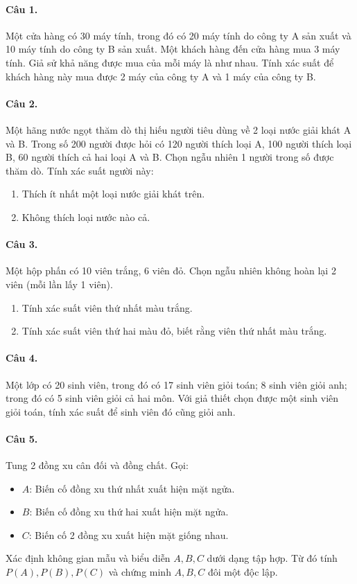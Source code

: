 \documentclass[12pt,a4paper]{article}
\theoremstyle{definition}
\begin{document}
\paragraph{Câu 1.} Một cửa hàng có 30 máy tính, trong đó có 20 máy tính do công ty A sản xuất và 10 máy tính do công ty B sản xuất. Một khách hàng đến cửa hàng mua 3 máy tính. Giả sử khả năng được mua của mỗi máy là như nhau. Tính xác suất để khách hàng này mua được 2 máy của công ty A và 1 máy của công ty B.

\paragraph{Câu 2.} Một hãng nước ngọt thăm dò thị hiếu người tiêu dùng về 2 loại nước giải khát A và B. Trong số 200 người được hỏi có 120 người thích loại A, 100 người thích loại B, 60 người thích cả hai loại A và B. Chọn ngẫu nhiên 1 người trong số được thăm dò. Tính xác suất người này:
\begin{enumerate}[label=\arabic*.]
    \item Thích ít nhất một loại nước giải khát trên.
    \item Không thích loại nước nào cả.
\end{enumerate}

\paragraph{Câu 3.} Một hộp phấn có 10 viên trắng, 6 viên đỏ. Chọn ngẫu nhiên không hoàn lại 2 viên (mỗi lần lấy 1 viên).
\begin{enumerate}[label=\arabic*.]
    \item Tính xác suất viên thứ nhất màu trắng.
    \item Tính xác suất viên thứ hai màu đỏ, biết rằng viên thứ nhất màu trắng.
\end{enumerate}

\paragraph{Câu 4.} Một lớp có 20 sinh viên, trong đó có 17 sinh viên giỏi toán; 8 sinh viên giỏi anh; trong đó có 5 sinh viên giỏi cả hai môn. Với giả thiết chọn được một sinh viên giỏi toán, tính xác suất để sinh viên đó cũng giỏi anh.

\paragraph{Câu 5.} Tung 2 đồng xu cân đối và đồng chất. Gọi:
\begin{itemize}
    \item $A$: Biến cố đồng xu thứ nhất xuất hiện mặt ngửa.
    \item $B$: Biến cố đồng xu thứ hai xuất hiện mặt ngửa.
    \item $C$: Biến cố 2 đồng xu xuất hiện mặt giống nhau.
\end{itemize}
Xác định không gian mẫu và biểu diễn $A, B, C$ dưới dạng tập hợp. Từ đó tính $P(A), P(B), P(C)$ và chứng minh $A, B, C$ đôi một độc lập.
\end{document}
